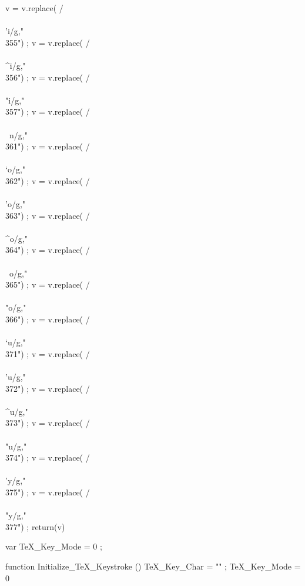 {      v = v.replace(  /\\\\'i/g,"\\355") ;
      v = v.replace(  /\\\\^i/g,"\\356") ;
      v = v.replace(  /\\\\"i/g,"\\357") ;
      v = v.replace(  /\\\\~n/g,"\\361") ;
      v = v.replace(  /\\\\`o/g,"\\362") ;
      v = v.replace(  /\\\\'o/g,"\\363") ;
      v = v.replace(  /\\\\^o/g,"\\364") ;
      v = v.replace(  /\\\\~o/g,"\\365") ;
      v = v.replace(  /\\\\"o/g,"\\366") ;
      v = v.replace(  /\\\\`u/g,"\\371") ;
      v = v.replace(  /\\\\'u/g,"\\372") ;
      v = v.replace(  /\\\\^u/g,"\\373") ;
      v = v.replace(  /\\\\"u/g,"\\374") ;
      v = v.replace(  /\\\\'y/g,"\\375") ;
      v = v.replace(  /\\\\"y/g,"\\377") ;
      return(v) }

  var TeX_Key_Mode = 0 ;

  function Initialize_TeX_Keystroke ()
    { TeX_Key_Char = "" ;
      TeX_Key_Mode = 0 }

